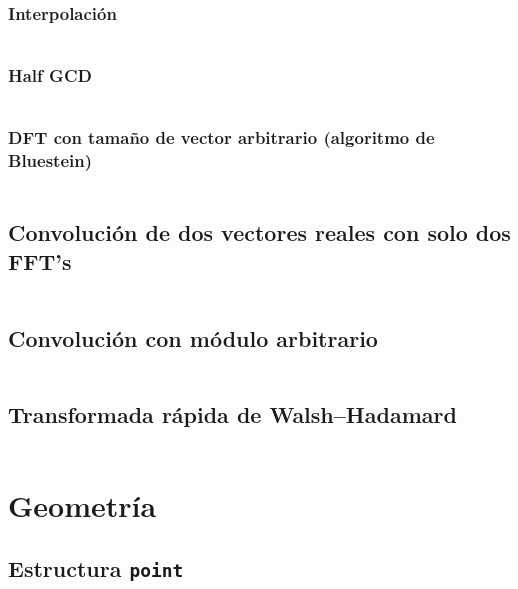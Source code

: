 \documentclass[11pt]{article}
\begin{document}
			\subsubsection{Interpolación}
			\inputminted[tabsize=2,breaklines,firstline=296,lastline=320,fontsize=\small]{c++}{fft.cpp}
			
			\subsubsection{Half GCD}
			\inputminted[tabsize=2,breaklines,firstline=322,lastline=397,fontsize=\small]{c++}{fft.cpp}
			
			\subsubsection{DFT con tamaño de vector arbitrario (algoritmo de Bluestein)}
			\inputminted[tabsize=2,breaklines,firstline=399,lastline=419,fontsize=\small]{c++}{fft.cpp}
			
		\subsection{Convolución de dos vectores reales con solo dos FFT's}
		\inputminted[tabsize=2,breaklines,firstline=421,lastline=441,fontsize=\small]{c++}{fft.cpp}
			
		\subsection{Convolución con módulo arbitrario}
		\inputminted[tabsize=2,breaklines,firstline=443,lastline=500,fontsize=\small]{c++}{fft.cpp}
		
		\subsection{Transformada rápida de Walsh–Hadamard}
		\inputminted[tabsize=2,breaklines,firstline=502,lastline=533,fontsize=\small]{c++}{fft.cpp}
			
	\newpage
	\section{Geometría}
		\subsection{Estructura \texttt{point}}
		\inputminted[tabsize=2,breaklines,firstline=3,lastline=60,fontsize=\small]{c++}{geometry.cpp}
		
\end{document}
